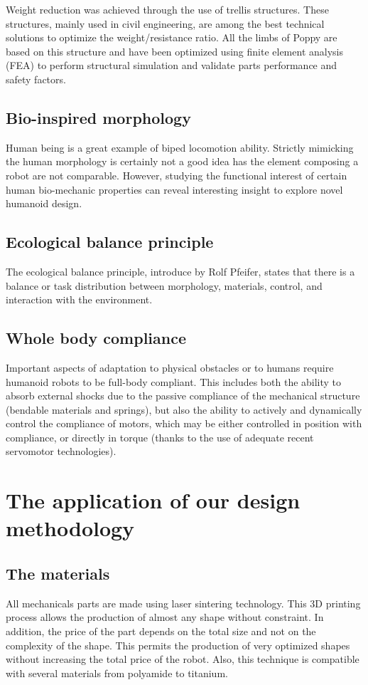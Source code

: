 Weight reduction was achieved through the use of trellis structures. These structures, mainly used in civil engineering, are among the best technical solutions to optimize the weight/resistance ratio. All the limbs of Poppy are based on this structure and have been optimized using finite element analysis (FEA) to perform structural simulation and validate parts performance and safety factors.

\subsection{Bio-inspired morphology} %
Human being is a great example of biped locomotion ability. Strictly mimicking the human morphology is certainly not a good idea has the element composing a robot are not comparable. However, studying the functional interest of certain human bio-mechanic properties can reveal interesting insight to explore novel humanoid design.

\subsection{Ecological balance principle} %
The ecological balance principle, introduce by Rolf Pfeifer, states that there is a balance or task distribution between morphology, materials, control, and interaction with the environment.

\subsection{Whole body compliance} %
Important aspects of adaptation to physical obstacles or to humans require humanoid robots to be full-body compliant. This includes both the ability to absorb external shocks due to the passive compliance of the mechanical structure (bendable materials and springs), but also the ability to actively and dynamically control the compliance of motors, which may be either controlled in position with compliance, or directly in torque (thanks to the use of adequate recent servomotor technologies).



\section{The application of our design methodology} %

\subsection{The materials} %
All mechanicals parts are made using laser sintering technology. This 3D printing process allows the production of almost any shape without constraint. In addition, the price of the part depends on the total size and not on the complexity of the shape. This permits the production of very optimized shapes without increasing the total price of the robot. Also, this technique is compatible with several materials from polyamide to titanium. 

